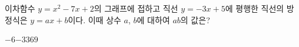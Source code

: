 이차함수 $y=x^2-7x+2$의 그래프에 접하고 직선 $y=-3x+5$에 평행한 직선의 방정식은 $y=ax+b$이다. 이때 상수 $a$, $b$에 대하여 $ab$의 값은?
\begin{choices32}{$-6$}{$-3$}{$3$}{$6$}{$9$}\end{choices32}
